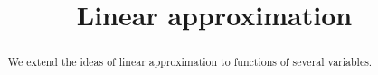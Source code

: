 \documentclass{ximera}
\title[Dig-In:]{Linear approximation}
\begin{document}
\begin{abstract}
  We extend the ideas of linear approximation to functions of several variables.
\end{abstract}
\maketitle
\end{document}
